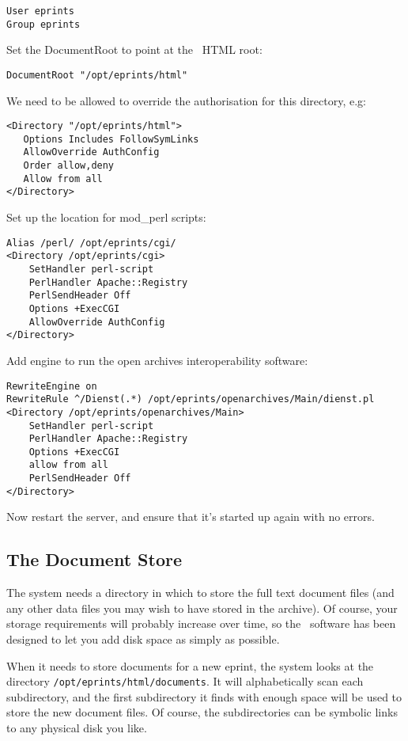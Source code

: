 \begin{verbatim}
User eprints
Group eprints
\end{verbatim}

Set the DocumentRoot to point at the \eprints\ HTML root:

\begin{verbatim}
DocumentRoot "/opt/eprints/html"
\end{verbatim}

We need to be allowed to override the authorisation for this directory, e.g:

\begin{verbatim}
<Directory "/opt/eprints/html">
   Options Includes FollowSymLinks
   AllowOverride AuthConfig
   Order allow,deny
   Allow from all
</Directory>
\end{verbatim}

Set up the location for mod\_perl scripts:

\begin{verbatim}
Alias /perl/ /opt/eprints/cgi/
<Directory /opt/eprints/cgi>
    SetHandler perl-script
    PerlHandler Apache::Registry
    PerlSendHeader Off
    Options +ExecCGI
    AllowOverride AuthConfig
</Directory>
\end{verbatim}

Add engine to run the open archives interoperability software:

\begin{verbatim}
RewriteEngine on
RewriteRule ^/Dienst(.*) /opt/eprints/openarchives/Main/dienst.pl
<Directory /opt/eprints/openarchives/Main>
    SetHandler perl-script
    PerlHandler Apache::Registry
    Options +ExecCGI
    allow from all
    PerlSendHeader Off
</Directory>
\end{verbatim}

Now restart the server, and ensure that it's started up again with no errors.


\subsection{The Document Store}

The system needs a directory in which to store the full text document files (and any other data files you may wish to have stored in the archive). Of course, your storage requirements will probably increase over time, so the \eprints\ software has been designed to let you add disk space as simply as possible.

When it needs to store documents for a new eprint, the system looks at the directory {\tt /opt/eprints/html/documents}. It will alphabetically scan each subdirectory, and the first subdirectory it finds with enough space will be used to store the new document files. Of course, the subdirectories can be symbolic links to any physical disk you like.

